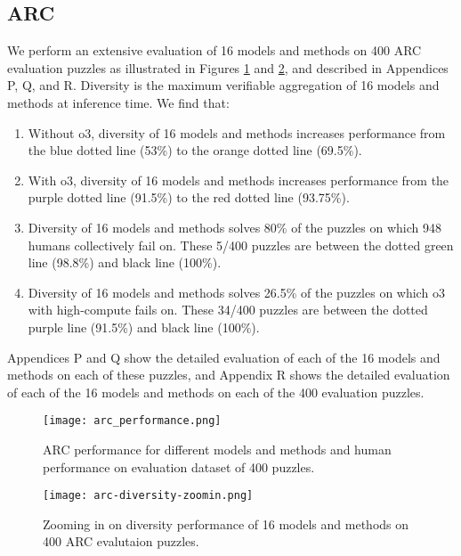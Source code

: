 \subsection{ARC}
We perform an extensive evaluation of 16 models and methods on 400 ARC evaluation puzzles as illustrated in Figures \ref{fig:arc-performance} and \ref{fig:arc-diversity-performance}, and described in Appendices P, Q, and R. Diversity is the maximum verifiable aggregation of 16 models and methods at inference time. We find that:
\begin{enumerate}
\item Without o3, diversity of 16 models and methods increases performance from the blue dotted line (53\%) to the orange dotted line (69.5\%).
\vspace{-5pt}
\item With o3, diversity of 16 models and methods increases performance from the purple dotted line (91.5\%) to the red dotted line (93.75\%).
\vspace{-5pt}
\item Diversity of 16 models and methods solves 80\% of the puzzles on which 948 humans collectively fail on. These 5/400 puzzles are between the dotted green line (98.8\%) and black line (100\%).
\vspace{-5pt}
\item Diversity of 16 models and methods solves 26.5\% of the puzzles on which o3 with high-compute fails on. These 34/400 puzzles are between the dotted purple line (91.5\%) and black line (100\%).
\end{enumerate}
Appendices P and Q show the detailed evaluation of each of the 16 models and methods on each of these puzzles, and Appendix R shows the detailed evaluation of each of the 16 models and methods on each of the 400 evaluation puzzles.

\begin{figure}[h]
    \centering
    \texttt{[image: arc\_performance.png]}
    \caption{ARC performance for different models and methods and human performance on evaluation dataset of 400 puzzles.}
    \label{fig:arc-performance}
\end{figure}

\begin{figure}[h]
    \centering
    \texttt{[image: arc-diversity-zoomin.png]}
    \caption{Zooming in on diversity performance of 16 models and methods on 400 ARC evalutaion puzzles.}
    \label{fig:arc-diversity-performance}
\end{figure}

